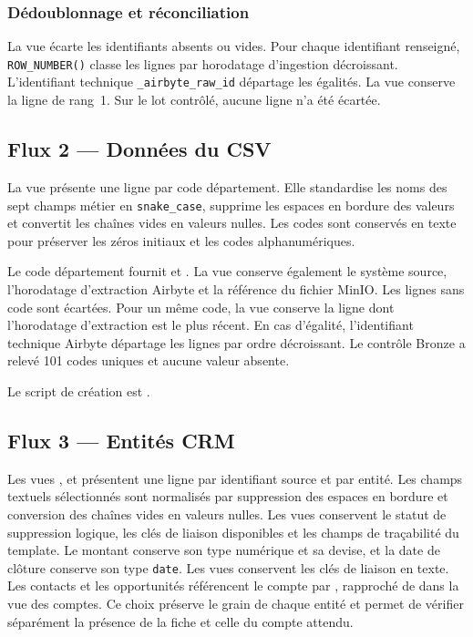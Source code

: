 \documentclass[11pt,a4paper]{article}
\newcommand{\code}[1]{\texttt{#1}}
\begin{document}
\subsubsection{Dédoublonnage et réconciliation}

La vue écarte les identifiants absents ou vides. Pour chaque
identifiant renseigné, \code{ROW\_NUMBER()} classe les lignes
par horodatage d'ingestion décroissant. L'identifiant technique
\verb|_airbyte_raw_id| départage les égalités. La vue conserve
la ligne de rang~1. Sur le lot contrôlé, aucune ligne n'a été écartée.

\subsection{Flux 2 --- Données du CSV}

La vue  présente une ligne par code
département. Elle standardise les noms des sept champs métier en
\code{snake\_case}, supprime les espaces en bordure des valeurs
et convertit les chaînes vides en valeurs nulles. Les codes sont
conservés en texte pour préserver les zéros initiaux et les codes
alphanumériques.

Le code département fournit  et .
La vue conserve également le système source, l'horodatage d'extraction
Airbyte et la référence du fichier MinIO. Les lignes sans code sont
écartées. Pour un même code, la vue conserve la ligne dont l'horodatage
d'extraction est le plus récent. En cas d'égalité, l'identifiant
technique Airbyte départage les lignes par ordre décroissant.
Le contrôle Bronze a relevé 101 codes uniques et aucune valeur absente.

Le script de création est .

\subsection{Flux 3 --- Entités CRM}

Les vues , 
et  présentent une ligne par identifiant
source et par entité. Les champs textuels sélectionnés sont normalisés
par suppression des espaces en bordure et conversion des chaînes vides
en valeurs nulles. Les vues conservent le statut de suppression logique,
les clés de liaison disponibles et les champs de traçabilité du template.
Le montant conserve son type numérique et sa devise, et la date de
clôture conserve son type \code{date}. Les vues conservent les
clés de liaison en texte. Les contacts et les opportunités
référencent le compte par , rapproché de
 dans la vue des comptes. Ce choix préserve le grain
de chaque entité et permet de vérifier séparément la présence
de la fiche et celle du compte attendu.
\end{document}
